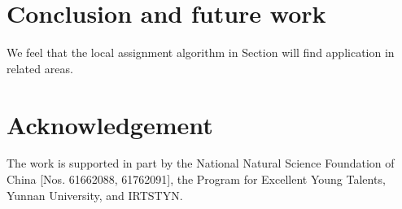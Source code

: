 \documentclass[11pt,a4paper]{article}
\begin{document}
\section{Conclusion and future work}
We feel that the local assignment algorithm in Section will find
application in related areas.




\section*{Acknowledgement}
The work is
supported in part by the National Natural Science Foundation of
China [Nos. 61662088, 61762091], the Program
for Excellent Young Talents, Yunnan University, and IRTSTYN.

\begin{thebibliography}{}




\end{thebibliography}
\end{document}
